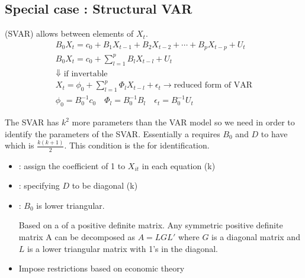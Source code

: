 \subsection{Special case : Structural VAR}

 (SVAR) allows  between elements of $X_t$.
\begin{gather*}
    B_0 X_t = c_0 + B_1 X_{t-1} + B_2 X_{t-2} + \cdots + B_p X_{t-p} + U_t\\
    B_0 X_t = c_0 + \sum_{l=1}^{p} B_l X_{t-l} + U_t\\
    \Downarrow \text{ if invertable}\\
    X_t = \phi_0 + \sum_{l=1}^{p} \Phi_l X_{t-l} + \epsilon_t \to \text{reduced form of VAR}\\
    \phi_0 = B_0^{-1} c_0 \quad \Phi_l = B_0^{-1}B_l \quad \epsilon_t = B_0^{-1}U_t
\end{gather*}

The SVAR has $k^2$ more parameters than the VAR model so we need  in order to identify the parameters of the SVAR.
Essentially a  requires $B_0$ and $D$ to have  which is $\frac{k(k+1)}{2}$.
This condition is the  for identification.
\begin{itemize}
    \item {}: assign the coefficient of 1 to $X_{it}$ in each equation (k)
    \item {}: specifying $D$ to be diagonal (k)
    \item {}: $B_0$ is lower triangular.
    \begin{definition}
        Based on a  of a positive definite matrix.
        Any symmetric positive definite matrix A can be decomposed as $A = LGL'$ where $G$ is a diagonal matrix and $L$ is a lower triangular matrix with 1's in the diagonal.
    \end{definition}
    \item Impose restrictions based on economic theory
\end{itemize}

